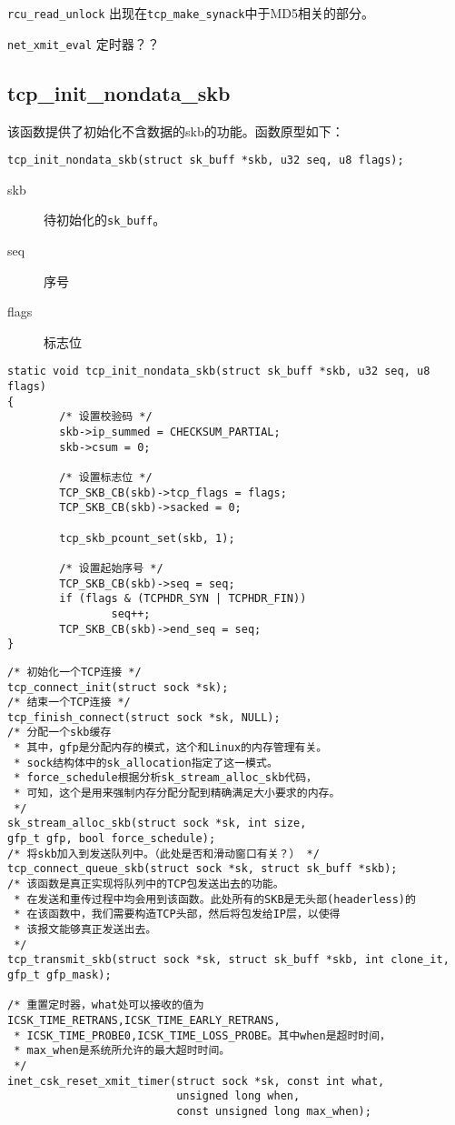 	\texttt{rcu_read_unlock} 出现在\texttt{tcp_make_synack}中于MD5相关的部分。
	
	\texttt{net_xmit_eval}	定时器？？
\subsection{tcp\_init\_nondata\_skb}
该函数提供了初始化不含数据的skb的功能。函数原型如下：
\begin{verbatim}
tcp_init_nondata_skb(struct sk_buff *skb, u32 seq, u8 flags);
\end{verbatim}

\begin{description}
  \item[skb] 待初始化的\texttt{sk_buff}。
  \item[seq] 序号
  \item[flags] 标志位
\end{description}

\begin{verbatim}
static void tcp_init_nondata_skb(struct sk_buff *skb, u32 seq, u8 flags)
{
        /* 设置校验码 */
        skb->ip_summed = CHECKSUM_PARTIAL;
        skb->csum = 0;

        /* 设置标志位 */
        TCP_SKB_CB(skb)->tcp_flags = flags;
        TCP_SKB_CB(skb)->sacked = 0;

        tcp_skb_pcount_set(skb, 1);

        /* 设置起始序号 */
        TCP_SKB_CB(skb)->seq = seq;
        if (flags & (TCPHDR_SYN | TCPHDR_FIN))
                seq++;
        TCP_SKB_CB(skb)->end_seq = seq;
}
\end{verbatim}

\begin{verbatim}
/* 初始化一个TCP连接 */
tcp_connect_init(struct sock *sk);
/* 结束一个TCP连接 */
tcp_finish_connect(struct sock *sk, NULL);
/* 分配一个skb缓存
 * 其中，gfp是分配内存的模式，这个和Linux的内存管理有关。
 * sock结构体中的sk_allocation指定了这一模式。
 * force_schedule根据分析sk_stream_alloc_skb代码，
 * 可知，这个是用来强制内存分配分配到精确满足大小要求的内存。
 */
sk_stream_alloc_skb(struct sock *sk, int size,
gfp_t gfp, bool force_schedule);
/* 将skb加入到发送队列中。（此处是否和滑动窗口有关？） */ 
tcp_connect_queue_skb(struct sock *sk, struct sk_buff *skb);
/* 该函数是真正实现将队列中的TCP包发送出去的功能。
 * 在发送和重传过程中均会用到该函数。此处所有的SKB是无头部(headerless)的
 * 在该函数中，我们需要构造TCP头部，然后将包发给IP层，以使得
 * 该报文能够真正发送出去。
 */
tcp_transmit_skb(struct sock *sk, struct sk_buff *skb, int clone_it,
gfp_t gfp_mask);

/* 重置定时器，what处可以接收的值为ICSK_TIME_RETRANS,ICSK_TIME_EARLY_RETRANS,
 * ICSK_TIME_PROBE0,ICSK_TIME_LOSS_PROBE。其中when是超时时间，
 * max_when是系统所允许的最大超时时间。
 */
inet_csk_reset_xmit_timer(struct sock *sk, const int what,
                          unsigned long when,
                          const unsigned long max_when);
\end{verbatim}

